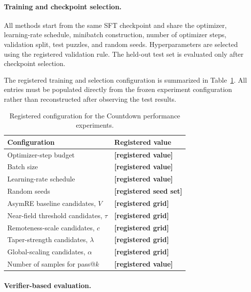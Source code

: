 \paragraph{Training and checkpoint selection.}

All methods start from the same SFT checkpoint and share the optimizer,
learning-rate schedule, minibatch construction, number of optimizer
steps, validation split, test puzzles, and random seeds. Hyperparameters
are selected using the registered validation rule. The held-out test set
is evaluated only after checkpoint selection.

The registered training and selection configuration is summarized in
Table~\ref{tab:countdown_registered_config}. All entries must be
populated directly from the frozen experiment configuration rather than
reconstructed after observing the test results.

\begin{table}[t]
\centering
\caption{Registered configuration for the Countdown performance experiments.}
\label{tab:countdown_registered_config}

\small
\setlength{\tabcolsep}{8pt}
\renewcommand{\arraystretch}{1.12}

\begin{tabular}{@{}ll@{}}
\toprule
Configuration & Registered value \\
\midrule
Optimizer-step budget
& \textbf{[registered value]} \\
Batch size
& \textbf{[registered value]} \\
Learning-rate schedule
& \textbf{[registered value]} \\
Random seeds
& \textbf{[registered seed set]} \\
AsymRE baseline candidates, $V$
& \textbf{[registered grid]} \\
Near-field threshold candidates, $\tau$
& \textbf{[registered grid]} \\
Remoteness-scale candidates, $c$
& \textbf{[registered grid]} \\
Taper-strength candidates, $\lambda$
& \textbf{[registered grid]} \\
Global-scaling candidates, $\alpha$
& \textbf{[registered grid]} \\
Number of samples for pass@$k$
& \textbf{[registered value]} \\
\bottomrule
\end{tabular}
\end{table}

\paragraph{Verifier-based evaluation.}

